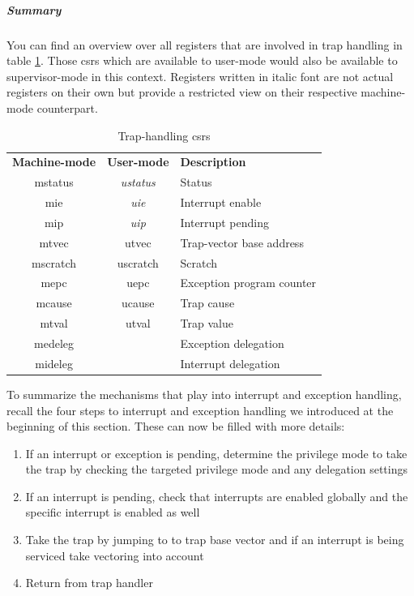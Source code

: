 \subparagraph{Summary}
You can find an overview over all registers that are involved in trap handling in table \ref{tbl:trap-csrs}.
Those \glspl{csr} which are available to user-mode would also be available to supervisor-mode in this context.
Registers written in italic font are not actual registers on their own but provide a restricted view on their respective machine-mode counterpart.

\begin{table}
    \centering
    \begin{tabular}{| c c || l |}
        \hline
        \textbf{Machine-mode} & \textbf{User-mode} & \textbf{Description} \\
        \acrshort{mstatus} & \textit{\acrshort{ustatus}} & Status \\
        \acrshort{mie} & \textit{\acrshort{uie}} & Interrupt enable \\
        \acrshort{mip} & \textit{\acrshort{uip}} & Interrupt pending \\
        \acrshort{mtvec} & \acrshort{utvec} & Trap-vector base address \\
        \acrshort{mscratch} & \acrshort{uscratch} & Scratch \\
        \acrshort{mepc} & \acrshort{uepc} & Exception program counter \\
        \acrshort{mcause} & \acrshort{ucause} & Trap cause \\
        \acrshort{mtval} & \acrshort{utval} & Trap value \\
        \acrshort{medeleg} & & Exception delegation \\
        \acrshort{mideleg} & & Interrupt delegation \\
        \hline
    \end{tabular}
    \caption{Trap-handling \glspl{csr}}
    \label{tbl:trap-csrs}
\end{table}

To summarize the mechanisms that play into interrupt and exception handling, recall the four steps to interrupt and exception handling we introduced at the beginning of this section.
These can now be filled with more details:
\begin{enumerate}
    \item If an interrupt or exception is pending, determine the privilege mode to take the trap by checking the targeted privilege mode and any delegation settings
    \item If an interrupt is pending, check that interrupts are enabled globally and the specific interrupt is enabled as well
    \item Take the trap by jumping to to trap base vector and if an interrupt is being serviced take vectoring into account
    \item Return from trap handler
\end{enumerate}

